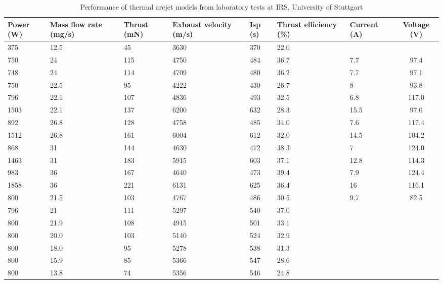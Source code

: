 \begin{table}[h]
\caption{Performance of thermal arcjet models from laboratory tests at IRS, University of Stuttgart}
\label{tab:Arcjet-performance}
\begin{center}
\begin{tabular}{C{0.1\textwidth} C{0.1\textwidth} C{0.1\textwidth} C{0.12\textwidth} C{0.05\textwidth} C{0.13\textwidth} C{0.11\textwidth} c }\toprule
Power (W) & Mass flow rate (mg/s) & Thrust (mN) & Exhaust velocity (m/s) & Isp (s) & Thrust efficiency (\%) & Current (A) & Voltage (V) \\\midrule
375 & 12.5 & 45 & 3630 & 370 & 22.0 &&\\
750 & 24 & 115 & 4750 & 484 & 36.7 & 7.7 & 97.4 \\
748 & 24 & 114 & 4709 & 480 & 36.2 & 7.7 & 97.1 \\
750 & 22.5 & 95 & 4222 & 430 & 26.7 & 8 & 93.8 \\
796 & 22.1 & 107 & 4836 & 493 & 32.5 & 6.8 & 117.0 \\
1503 & 22.1 & 137 & 6200 & 632 & 28.3 & 15.5 & 97.0 \\
892 & 26.8 & 128 & 4758 & 485 & 34.0 & 7.6 & 117.4 \\
1512 & 26.8 & 161 & 6004 & 612 & 32.0 & 14.5 & 104.2 \\
868 & 31 & 144 & 4630 & 472 & 38.3 & 7 & 124.0 \\
1463 & 31 & 183 & 5915 & 603 & 37.1 & 12.8 & 114.3 \\
983 & 36 & 167 & 4640 & 473 & 39.4 & 7.9 & 124.4 \\
1858 & 36 & 221 & 6131 & 625 & 36.4 & 16 & 116.1 \\
800 & 21.5 & 103 & 4767 & 486 & 30.5 & 9.7 & 82.5 \\
796 & 21 & 111 & 5297 & 540 & 37.0 &&\\
800 & 21.9 & 108 & 4915 & 501 & 33.1 &&\\
800 & 20.0 & 103 & 5140 & 524 & 32.9 &&\\
800 & 18.0 &  95 & 5278 & 538 & 31.3 &&\\
800 & 15.9 & 85 & 5366 & 547 & 28.6 &&\\
800 & 13.8 & 74 & 5356 & 546 & 24.8 &&\\\bottomrule
\end{tabular}
\end{center}
\end{table}

